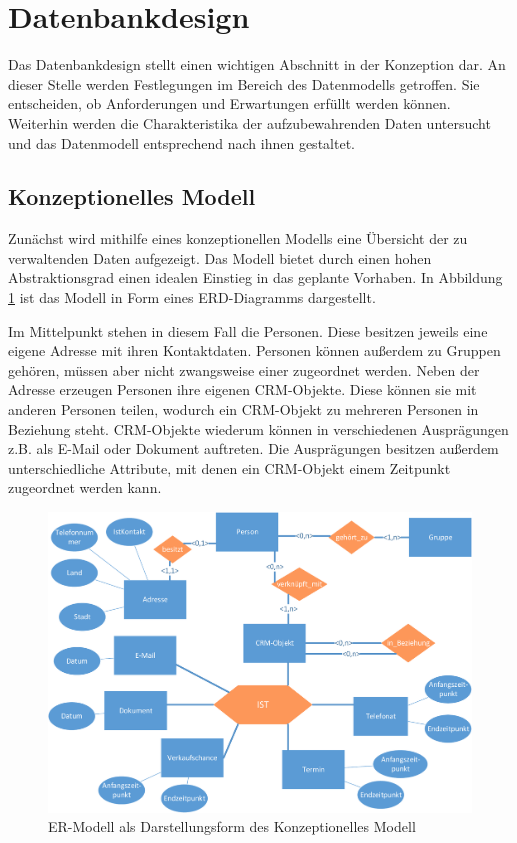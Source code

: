 \section{Datenbankdesign}

Das Datenbankdesign stellt einen wichtigen Abschnitt in der Konzeption dar. An dieser Stelle werden Festlegungen im Bereich des Datenmodells getroffen. Sie entscheiden, ob Anforderungen und Erwartungen erfüllt werden können. Weiterhin werden die Charakteristika der aufzubewahrenden Daten untersucht und das Datenmodell entsprechend nach ihnen gestaltet.

\subsection{Konzeptionelles Modell}

Zunächst wird mithilfe eines konzeptionellen Modells eine Übersicht der zu verwaltenden Daten aufgezeigt. Das Modell bietet durch einen hohen Abstraktionsgrad einen idealen Einstieg in das geplante Vorhaben. In Abbildung \ref{konzept_erd} ist das Modell in Form eines ERD-Diagramms dargestellt. 

Im Mittelpunkt stehen in diesem Fall die Personen. Diese besitzen jeweils eine eigene Adresse mit ihren Kontaktdaten. Personen können außerdem zu Gruppen gehören, müssen aber nicht zwangsweise einer zugeordnet werden. Neben der Adresse erzeugen Personen ihre eigenen CRM-Objekte. Diese können sie mit anderen Personen teilen, wodurch ein CRM-Objekt zu mehreren Personen in Beziehung steht. CRM-Objekte wiederum können in verschiedenen Ausprägungen z.B. als E-Mail oder Dokument auftreten. Die Ausprägungen besitzen außerdem unterschiedliche Attribute, mit denen ein CRM-Objekt einem Zeitpunkt zugeordnet werden kann.

\begin{figure}[htbp]
\centering
  \includegraphics[width=1.0\textwidth, width=1.0\textwidth]{pics/konzept_erd.pdf}
\caption{ER-Modell als Darstellungsform des Konzeptionelles Modell}
\label{konzept_erd}
\end{figure} 

